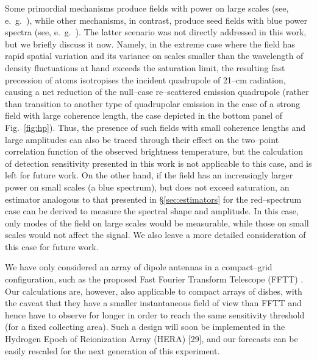 Some primordial mechanisms produce fields with power on large scales (see, e.~g.~\cite{2001PhLB..501..165D}), while other mechanisms, in contrast, produce seed fields with blue power spectra (see, e.~g.~\cite{2006Sci...311..827I,Naoz13}). The latter scenario was not directly addressed in this work, but we briefly discuss it now. Namely, in the extreme case where the field has rapid spatial variation and its variance on scales smaller than the wavelength of density fluctuations at hand exceeds the saturation limit, the resulting fast precession of atoms isotropises the incident quadrupole of 21--cm radiation, causing a net reduction of the null--case re--scattered emission quadrupole (rather than transition to another type of quadrupolar emission in the case of a strong field with large coherence length, the case depicted in the bottom panel of Fig.~\ref{fig:hp}). Thus, the presence of such fields with small coherence lengths and large amplitudes can also be traced through their effect on the two--point correlation function of the observed brightness temperature, but the calculation of detection sensitivity presented in this work is not applicable to this case, and is left for future work. On the other hand, if the field has an increasingly larger power on small scales (a blue spectrum), but does not exceed saturation, an estimator analogous to that presented in \S\ref{sec:estimators} for the red--spectrum case can be derived to measure the spectral shape and amplitude. In this case, only modes of the field on large scales would be measurable, while those on small scales would not affect the signal. We also leave a more detailed consideration of this case for future work.

We have only considered an array of dipole antennas in a compact--grid configuration, such as the proposed Fast Fourier Transform Telescope (FFTT) \cite{2009PhRvD..79h3530T}. Our calculations are, however, also applicable to compact arrays of dishes, with the caveat that they have a smaller instantaneous field of view than FFTT and hence have to observe for longer in order to reach the same sensitivity threshold (for a fixed collecting area). Such a design will soon be implemented in the Hydrogen Epoch of Reionization Array (HERA) [29], and our forecasts can be easily rescaled for the next generation of this experiment.

